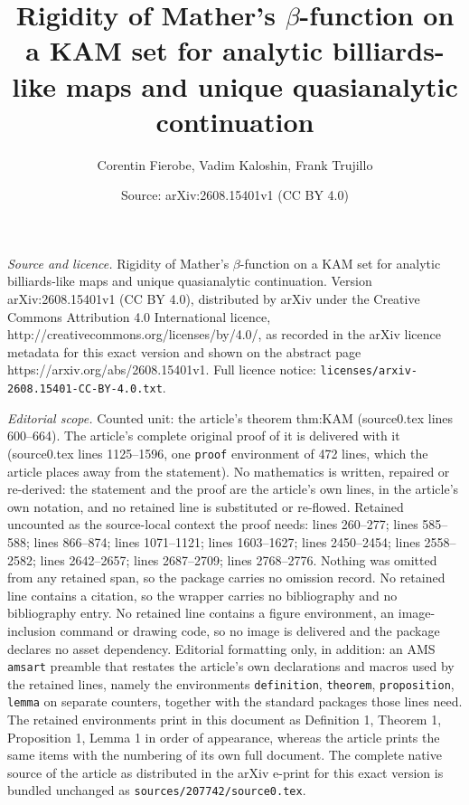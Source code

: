 \documentclass[10pt,a4paper]{amsart}
\title{Rigidity of Mather's $\beta$-function on a KAM set for analytic billiards-like maps and unique quasianalytic continuation}
\author{Corentin Fierobe, Vadim Kaloshin, Frank Trujillo}
\date{Source: arXiv:2608.15401v1 (CC BY 4.0)}
\begin{document}
\maketitle

\noindent\emph{Source and licence.} Rigidity of Mather's $\beta$-function on a KAM set for analytic billiards-like maps and unique quasianalytic continuation. Version arXiv:2608.15401v1 (CC BY 4.0), distributed by arXiv under the Creative Commons Attribution 4.0 International licence, http://creativecommons.org/licenses/by/4.0/, as recorded in the arXiv licence metadata for this exact version and shown on the abstract page https://arxiv.org/abs/2608.15401v1. Full licence notice: \texttt{licenses/arxiv-2608.15401-CC-BY-4.0.txt}.\par\smallskip

\noindent\textit{Editorial scope.} Counted unit: the article's theorem thm:KAM (source0.tex lines 600--664). The article's complete original proof of it is delivered with it (source0.tex lines 1125--1596, one \texttt{proof} environment of 472 lines, which the article places away from the statement). No mathematics is written, repaired or re-derived: the statement and the proof are the article's own lines, in the article's own notation, and no retained line is substituted or re-flowed.  Retained uncounted as the source-local context the proof needs: lines 260--277; lines 585--588; lines 866--874; lines 1071--1121; lines 1603--1627; lines 2450--2454; lines 2558--2582; lines 2642--2657; lines 2687--2709; lines 2768--2776.  Nothing was omitted from any retained span, so the package carries no omission record.  No retained line contains a citation, so the wrapper carries no bibliography and no bibliography entry.  No retained line contains a figure environment, an image-inclusion command or drawing code, so no image is delivered and the package declares no asset dependency.  Editorial formatting only, in addition: an AMS \texttt{amsart} preamble that restates the article's own declarations and macros used by the retained lines, namely the environments \texttt{definition}, \texttt{theorem}, \texttt{proposition}, \texttt{lemma} on separate counters, together with the standard packages those lines need.  The retained environments print in this document as Definition 1, Theorem 1, Proposition 1, Lemma 1 in order of appearance, whereas the article prints the same items with the numbering of its own full document.  The complete native source of the article as distributed in the arXiv e-print for this exact version is bundled unchanged as \texttt{sources/207742/source0.tex}.
\end{document}
